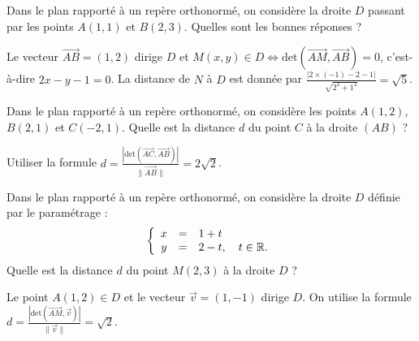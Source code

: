 \begin{question}
Dans le plan rapporté à un repère orthonormé, on considère la droite $D$ passant par les points $A(1,1)$ et $B(2,3)$. Quelles sont les bonnes réponses ?
\begin{answers}  
\end{answers}
\begin{explanations}
Le vecteur $\overrightarrow{AB}=(1,2)$ dirige $D$ et $M(x,y)\in D\Leftrightarrow \mbox{det} \left(\overrightarrow{AM},\overrightarrow{AB}\right)=0$, c'est-à-dire $2x-y-1=0$. La distance de $N$ à $D$ est donnée par $\displaystyle \frac{|2\times (-1)-2-1|}{\sqrt{2^2+1^2}}=\sqrt{5}$.
\end{explanations}
\end{question}






\begin{question}
Dans le plan rapporté à un repère orthonormé, on considère les points $\displaystyle A(1,2)$, $B(2,1)$ et $C(-2,1)$. Quelle est la distance $d$ du point $C$ à la droite $(AB)$ ?
\begin{answers}  
\end{answers}
\begin{explanations}
Utiliser la formule $\displaystyle d=\frac{\left|\mbox{det}\left(\overrightarrow{AC},\overrightarrow{AB}\right)\right|}{\|\overrightarrow{AB}\|}=2\sqrt{2}$.
\end{explanations}
\end{question}


\begin{question}
Dans le plan rapporté à un repère orthonormé, on considère la droite $D$ d\'efinie par le paramétrage :
$$\left\{\begin{array}{ccl}x&=&1+t\\ y&=&2-t,\quad t\in \mathbb{R}.
\end{array}\right.$$
Quelle est la distance $d$ du point $M(2,3)$ à la droite $D$ ?
\begin{answers}  
\end{answers}
\begin{explanations}
Le point $A(1,2)\in D$ et le vecteur $\vec{v}=(1,-1)$ dirige $D$. On utilise la formule $\displaystyle d=\frac{\left|\mbox{det}\left(\overrightarrow{AM},\vec{v}\right)\right|}{\|\vec{v}\|}=\sqrt{2}$.
\end{explanations}
\end{question}



